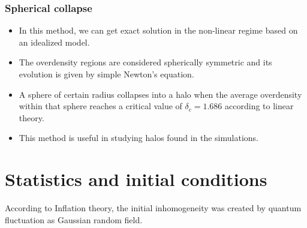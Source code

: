 \documentclass[12pt]{article}
\begin{document}
\subsubsection{Spherical collapse}
\label{sec:spherical-collapse}
\begin{itemize}
\item In this method, we can get exact solution in the non-linear regime based on an idealized model. 
\item The overdensity regions are considered spherically symmetric and its evolution is given by simple Newton's equation.
\item A sphere of certain radius collapses into a halo when the average overdensity within that sphere reaches a critical value of $\delta_c = 1.686$ according to linear theory.
\item This method is useful in studying halos found in the simulations.
\end{itemize}
 










\section{Statistics and initial conditions}
\label{sec:statistics}
According to Inflation theory, the initial inhomogeneity was created by quantum fluctuation as Gaussian random field.
\end{document}

